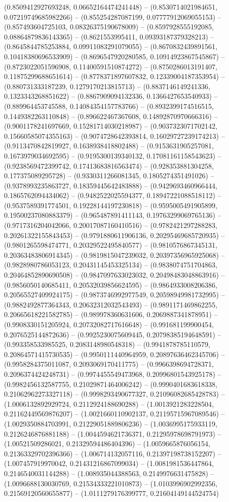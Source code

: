 (0.8509412927693248, 0.06652164474241448) -- (0.8530714021984651, 0.07219749685982266) -- (0.855254287087199, 0.07777912069055153) -- (0.857493604725103, 0.08326375190678009) -- (0.8597928555192085, 0.08864879836143365) -- (0.8621553995411, 0.09393187379328213) -- (0.8645844785253884, 0.09911083291079055) -- (0.8670832439891561, 0.10418380696533909) -- (0.8696547920280585, 0.10914923867545867) -- (0.8723022051596908, 0.11400591510874272) -- (0.8750286013191407, 0.11875299688651614) -- (0.8778371897607832, 0.12339004187353954) -- (0.880731333187239, 0.1279170213815713) -- (0.8837146149241336, 0.1323343268851622) -- (0.8867909094132336, 0.1366427653540933) -- (0.889964453745588, 0.14084354157783766) -- (0.8932399174516515, 0.1449382263110848) -- (0.896622467367608, 0.14892870970666316) -- (0.9001178241697669, 0.15281714030218987) -- (0.9037323071702142, 0.15660585074355163) -- (0.9074728642393814, 0.16029727239174213) -- (0.9113470842819927, 0.1638938418802488) -- (0.9153631905257081, 0.1673979034692595) -- (0.9195300139340132, 0.17081161158543623) -- (0.9238569472399742, 0.17413683816563474) -- (0.928353881304258, 0.177375089295728) -- (0.9330311266081345, 0.1805274351491026) -- (0.9378993235863727, 0.18359445642483888) -- (0.9429693460966444, 0.1865762094434062) -- (0.9482522025594377, 0.18947221088518112) -- (0.9537589391774501, 0.19228144197230818) -- (0.9595005491905899, 0.19500237080883379) -- (0.965487891411143, 0.19763299069765136) -- (0.9717316204042066, 0.20017087160410516) -- (0.9782421297288283, 0.20261322155843453) -- (0.9791880611906136, 0.20295469685720935) -- (0.9801265598474771, 0.20329522495840577) -- (0.9810576867345131, 0.20363483806914345) -- (0.9819815047239032, 0.20397356965925068) -- (0.9828980786053123, 0.20431145453325134) -- (0.9838074751704863, 0.20464852890690508) -- (0.9847097633023032, 0.20498483048863916) -- (0.9856050140685411, 0.20532039856624595) -- (0.9864933008206386, 0.20565527409924175) -- (0.9873746992977549, 0.20598949981732995) -- (0.9882492877364343, 0.20632312032543493) -- (0.9891171469862255, 0.20665618221582785) -- (0.989978360631606, 0.2069887341878951) -- (0.9908330151205924, 0.20732082717616648) -- (0.991681199900454, 0.2076525144872636) -- (0.9925230075609445, 0.20798385194648591) -- (0.993358533985525, 0.2083148980548318) -- (0.9941878785110579, 0.20864571415730535) -- (0.9950111440964959, 0.20897636462345706) -- (0.9958284375011087, 0.2093069170411775) -- (0.9966398694728371, 0.2096374424248731) -- (0.9974455549473968, 0.20996801543925178) -- (0.9982456132587755, 0.21029871464006242) -- (0.9990401683618338, 0.21062962273327118) -- (0.9998293490677327, 0.21096082685428783) -- (1.0006132892929724, 0.2112924188690288) -- (1.0013921283228504, 0.21162449569876207) -- (1.0021660110902137, 0.21195715967089546) -- (1.0029350884703991, 0.21229051889806236) -- (1.0036995175933119, 0.2126246876881188) -- (1.0044594621736371, 0.21295978698791973) -- (1.00521509286021, 0.21329594486404396) -- (1.0059665876056154, 0.21363329702396366) -- (1.006714132057116, 0.21397198738152207) -- (1.007457919970042, 0.21431216867099034) -- (1.0081981536447864, 0.2146540031144288) -- (1.008935044388563, 0.2149976631475828) -- (1.0096688130030769, 0.21534333221010873) -- (1.0103996902992356, 0.21569120560655877) -- (1.0111279176399777, 0.21604149144524754) 